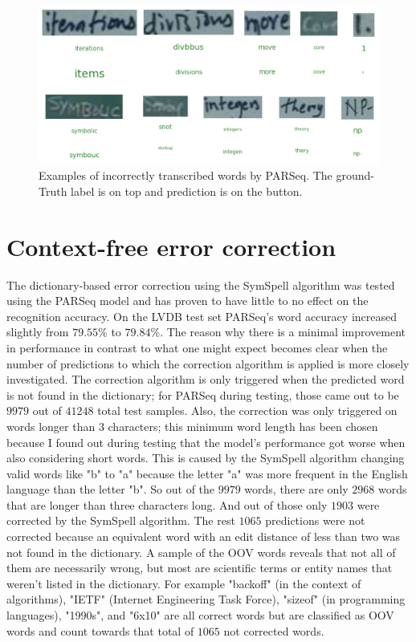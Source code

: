 

\begin{figure}[H]
        \centering
        \includegraphics[width=140mm]{figures/parseq_wrong_recog.png}
        \caption{Examples of incorrectly transcribed words by PARSeq. The ground-Truth label is on top and prediction is on the button.}
        \label{exp:parseq_wrong_recog}
\end{figure}

\section{Context-free error correction}

The dictionary-based error correction using the SymSpell algorithm was tested using the PARSeq model and has proven to have little to no effect on the recognition accuracy. On the LVDB test set PARSeq's word accuracy increased slightly from $79.55\%$ to $79.84\%$. The reason why there is a minimal improvement in performance in contrast to what one might expect becomes clear when the number of predictions to which the correction algorithm is applied is more closely investigated. The correction algorithm is only triggered when the predicted word is not found in the dictionary; for PARSeq during testing, those came out to be $9979$ out of $41248$ total test samples. Also, the correction was only triggered on words longer than 3 characters; this minimum word length has been chosen because I found out during testing that the model's performance got worse when also considering short words. This is caused by the SymSpell algorithm changing valid words like "b" to "a" because the letter "a" was more frequent in the English language than the letter "b". So out of the $9979$ words, there are only $2968$ words that are longer than three characters long. And out of those only $1903$ were corrected by the SymSpell algorithm. The rest $1065$ predictions were not corrected because an equivalent word with an edit distance of less than two was not found in the dictionary. A sample of the OOV words reveals that not all of them are necessarily wrong, but most are scientific terms or entity names that weren't listed in the dictionary. For example "backoff" (in the context of algorithms), "IETF" (Internet Engineering Task Force), "sizeof" (in programming languages), "1990s", and "6x10" are all correct words but are classified as OOV words and count towards that total of $1065$ not corrected words.